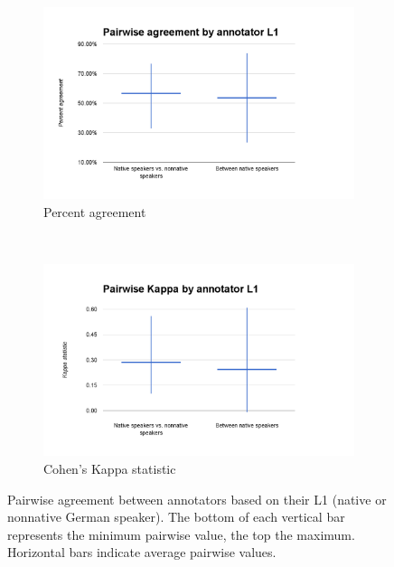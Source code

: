 		\begin{figure}[htb]
			\centering
			
			\begin{subfigure}[b]{.5\textwidth}
				\centering
				\includegraphics[width=\textwidth]{img/annotation/pairAgreeL1}
				\caption{Percent agreement}
				\label{fig:agree:L1:pct}
			\end{subfigure}%
			~
			\begin{subfigure}[b]{.5\textwidth}
				\centering
				\includegraphics[width=\textwidth]{img/annotation/pairKappaL1}
				\caption{Cohen's Kappa statistic}
				\label{fig:agree:L1:k}
			\end{subfigure}%
			
			\caption[Pairwise agreement statistics by annotator L1 group]{Pairwise agreement between annotators based on their L1  (native or nonnative German speaker). The bottom of each vertical bar represents the minimum pairwise value, the top the maximum. Horizontal bars indicate average pairwise values.}
			\label{fig:agree:L1}
		\end{figure}
		
